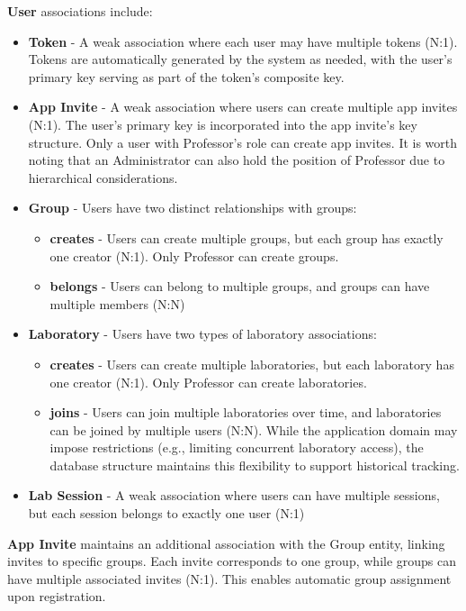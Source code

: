 \textbf{User} associations include:
\begin{itemize}
    \item \textbf{Token} - A weak association where each user may have multiple tokens (N:1). Tokens are automatically generated by the system as needed, with the user's primary key serving as part of the token's composite key.
    \item \textbf{App Invite} - A weak association where users can create multiple app invites (N:1). The user's primary key is incorporated into the app invite's key structure. Only a user with Professor's role can create app invites. 
    It is worth noting that an Administrator can also hold the position of Professor due to hierarchical considerations.    \item \textbf{Group} - Users have two distinct relationships with groups:
    \begin{itemize}
        \item \textbf{creates} - Users can create multiple groups, but each group has exactly one creator (N:1). Only Professor can create groups.
        \item \textbf{belongs} - Users can belong to multiple groups, and groups can have multiple members (N:N)
    \end{itemize}
    \item \textbf{Laboratory} - Users have two types of laboratory associations:
    \begin{itemize}
        \item \textbf{creates} - Users can create multiple laboratories, but each laboratory has one creator (N:1). Only Professor can create laboratories.
        \item \textbf{joins} - Users can join multiple laboratories over time, and laboratories can be joined by multiple users (N:N). While the application domain may impose restrictions (e.g., limiting concurrent laboratory access), the database structure maintains this flexibility to support historical tracking.
    \end{itemize}
    \item \textbf{Lab Session} - A weak association where users can have multiple sessions, but each session belongs to exactly one user (N:1)
\end{itemize}

\textbf{App Invite} maintains an additional association with the Group entity, linking invites to specific groups. Each invite corresponds to one group, while groups can have multiple associated invites (N:1). This enables automatic group assignment upon registration.

